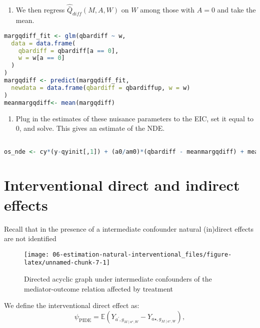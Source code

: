 \documentclass[
  12pt,
]{book}
\providecommand{\tightlist}{%
  \setlength{\itemsep}{0pt}\setlength{\parskip}{0pt}}
\theoremstyle{definition}
\theoremstyle{definition}
\theoremstyle{definition}
\newcommand{\E}{\mathbb{E}}
\newcommand{\1}{\mathbbm{1}}
\begin{document}
\begin{enumerate}
\def\labelenumi{\arabic{enumi}.}
\setcounter{enumi}{4}
\tightlist
\item
  We then regress \(\hat{\bar{Q}}_{diff}(M,A,W)\) on \(W\) among those
  with \(A=0\) and take the mean.
\end{enumerate}

\begin{lstlisting}[language=R]
margqdiff_fit <- glm(qbardiff ~ w,
  data = data.frame(
    qbardiff = qbardiff[a == 0],
    w = w[a == 0]
  )
)
margqdiff <- predict(margqdiff_fit,
  newdata = data.frame(qbardiff = qbardiffup, w = w)
)
meanmargqdiff<- mean(margqdiff)
\end{lstlisting}

\begin{enumerate}
\def\labelenumi{\arabic{enumi}.}
\setcounter{enumi}{5}
\tightlist
\item
  Plug in the estimates of these nuisance parameters to the EIC, set it equal to 0, and solve. This gives an estimate of the NDE.
\end{enumerate}

\begin{lstlisting}[language=R]

os_nde <- cy*(y-qyinit[,1]) + (a0/am0)*(qbardiff - meanmargqdiff) + meanmargqdiff
\end{lstlisting}

\hypertarget{interventional-direct-and-indirect-effects}{%
\section{Interventional direct and indirect effects}\label{interventional-direct-and-indirect-effects}}

Recall that in the presence of a intermediate confounder natural (in)direct effects are not identified

\begin{figure}

{\centering \texttt{[image: 06-estimation-natural-interventional\_files/figure-latex/unnamed-chunk-7-1]} 

}

\caption{Directed acyclic graph under intermediate confounders of the mediator-outcome relation affected by treatment}\label{fig:unnamed-chunk-7}
\end{figure}

We define the interventional direct effect as:
\begin{equation*}
  \psi_{\text{PIDE}} = \E(Y_{a^\prime,g_{M \mid a^\star,W}} -
    Y_{a\star,g_{M \mid a^\star,W}}),
\end{equation*}
\end{document}
